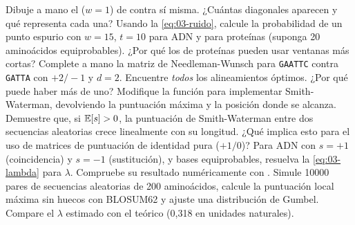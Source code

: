 \begin{ejercicios}
 Dibuje a mano el  ($w=1$) de  contra sí misma. ¿Cuántas diagonales aparecen y qué representa cada una?
 Usando la \cref{eq:03-ruido}, calcule la probabilidad de un punto espurio con $w=15$, $t=10$ para ADN y para proteínas (suponga 20 aminoácidos equiprobables). ¿Por qué los  de proteínas pueden usar ventanas más cortas?
 Complete a mano la matriz de Needleman-Wunsch para \texttt{GAATTC} contra \texttt{GATTA} con $+2/-1$ y $d=2$. Encuentre \emph{todos} los alineamientos óptimos. ¿Por qué puede haber más de uno?
 Modifique la función  para implementar Smith-Waterman, devolviendo la puntuación máxima y la posición donde se alcanza.
 Demuestre que, si $\mathbb{E}[s]>0$, la puntuación de Smith-Waterman entre dos secuencias aleatorias crece linealmente con su longitud. ¿Qué implica esto para el uso de matrices de puntuación de identidad pura ($+1/0$)?
 Para ADN con $s=+1$ (coincidencia) y $s=-1$ (sustitución), y bases equiprobables, resuelva la \cref{eq:03-lambda} para $\lambda$. Compruebe su resultado numéricamente con .
 Simule \num{10000} pares de secuencias aleatorias de 200 aminoácidos, calcule la puntuación local máxima sin huecos con BLOSUM62 y ajuste una distribución de Gumbel. Compare el $\lambda$ estimado con el teórico (0,318 en unidades naturales).
\end{ejercicios}

